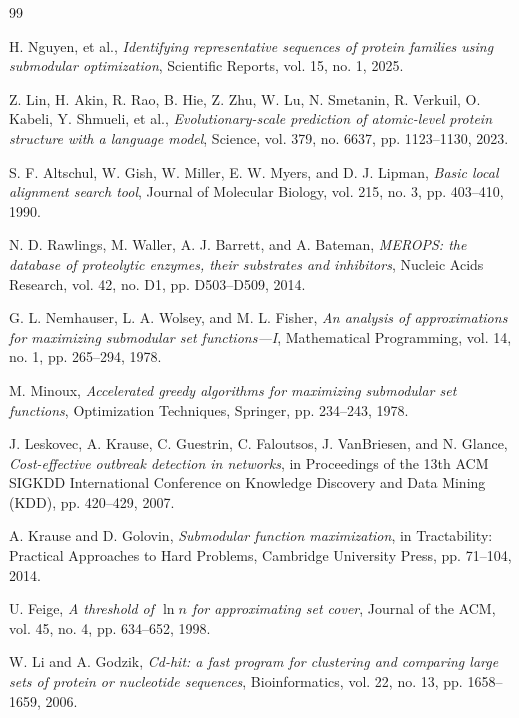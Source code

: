 \clearpage
{}
{}

\begingroup
{}
\begin{thebibliography}{99}
\raggedright
\setlength{\itemsep}{1pt}
\setlength{\parskip}{0pt}

H. Nguyen, et al.,
\textit{Identifying representative sequences of protein families using submodular optimization},
Scientific Reports, vol. 15, no. 1, 2025.

Z. Lin, H. Akin, R. Rao, B. Hie, Z. Zhu, W. Lu, N. Smetanin, R. Verkuil, O. Kabeli, Y. Shmueli, et al.,
\textit{Evolutionary-scale prediction of atomic-level protein structure with a language model},
Science, vol. 379, no. 6637, pp. 1123--1130, 2023.

S. F. Altschul, W. Gish, W. Miller, E. W. Myers, and D. J. Lipman,
\textit{Basic local alignment search tool},
Journal of Molecular Biology, vol. 215, no. 3, pp. 403--410, 1990.

N. D. Rawlings, M. Waller, A. J. Barrett, and A. Bateman,
\textit{MEROPS: the database of proteolytic enzymes, their substrates and inhibitors},
Nucleic Acids Research, vol. 42, no. D1, pp. D503--D509, 2014.

G. L. Nemhauser, L. A. Wolsey, and M. L. Fisher,
\textit{An analysis of approximations for maximizing submodular set functions---I},
Mathematical Programming, vol. 14, no. 1, pp. 265--294, 1978.

M. Minoux,
\textit{Accelerated greedy algorithms for maximizing submodular set functions},
Optimization Techniques, Springer, pp. 234--243, 1978.

J. Leskovec, A. Krause, C. Guestrin, C. Faloutsos, J. VanBriesen, and N. Glance,
\textit{Cost-effective outbreak detection in networks},
in Proceedings of the 13th ACM SIGKDD International Conference on Knowledge Discovery and Data Mining (KDD), pp. 420--429, 2007.

A. Krause and D. Golovin,
\textit{Submodular function maximization},
in Tractability: Practical Approaches to Hard Problems, Cambridge University Press, pp. 71--104, 2014.

U. Feige,
\textit{A threshold of $\ln n$ for approximating set cover},
Journal of the ACM, vol. 45, no. 4, pp. 634--652, 1998.

W. Li and A. Godzik,
\textit{Cd-hit: a fast program for clustering and comparing large sets of protein or nucleotide sequences},
Bioinformatics, vol. 22, no. 13, pp. 1658--1659, 2006.


\end{thebibliography}
